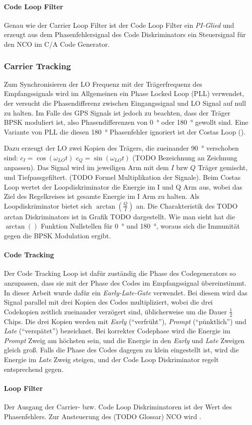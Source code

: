 \paragraph{Code Loop Filter} Genau wie der Carrier Loop Filter ist der Code Loop Filter ein \emph{PI-Glied} und erzeugt aus dem Phasenfehlersignal des Code Diskriminators ein Steuersignal für den NCO im C/A Code Generator.

\subsubsection{Carrier Tracking}
Zum Synchronisieren der LO Frequenz mit der Trägerfrequenz des Empfangssignals wird im Allgemeinen ein Phase Locked Loop (PLL) verwendet, der versucht die Phasendifferenz zwischen Eingangssignal und LO Signal auf null zu halten. Im Falle des GPS Signals ist jedoch zu beachten, dass der Träger BPSK moduliert ist, also Phasendifferenzen von \SI{0}{\degree} oder \SI{180}{\degree} gewollt sind. Eine Variante von PLL die diesen \SI{180}{\degree} Phasenfehler ignoriert ist der Costas Loop ().


Dazu erzeugt der LO zwei Kopien des Trägers, die zueinander \SI{90}{\degree} verschoben sind: $c_I=\cos(\omega_{LO} t)$ $c_Q=\sin(\omega_{LO} t)$ (TODO Bezeichnung an Zeichnung anpassen). Das Signal wird im jeweiligen Arm mit dem $I$ bzw $Q$ Träger gemischt, und Tiefpassgefiltert. (TODO Formel Multiplikation der Signale). Beim Costas Loop wertet der Loopdiskriminator die Energie im I und Q Arm aus, wobei das Ziel des Regelkreises ist gesamte Energie im I Arm zu halten. Als Loopdiskriminator bietet sich $\arctan\left(\frac{Q}{I}\right)$ an. Die Charakteristik des TODO arctan Diskriminators ist in Grafik TODO dargestellt. Wie man sieht hat die $\arctan()$ Funktion Nullstellen für \SI{0}{\degree} und \SI{180}{\degree}, woraus sich die Immunität gegen die BPSK Modulation ergibt.

\paragraph{Code Tracking}
Der Code Tracking Loop ist dafür zuständig die Phase des Codegenerators so anzupassen, dass sie mit der Phase des Codes im Empfangssignal übereinstimmt. In dieser Arbeit wurde dafür ein \emph{Early-Late-Gate} verwendet. Bei diesem wird das Signal parallel mit drei Kopien des Codes multipliziert, wobei die drei Codekopien zeitlich zueinander verzögert sind, üblicherweise um die Dauer $\frac{1}{2}$ Chips. Die drei Kopien werden mit \emph{Early} (\enquote{verfrüht}), \emph{Prompt} (\enquote{pünktlich}) und \emph{Late} (\enquote{verspätet}) bezeichnet. Bei korrekter Codephase wird die Energie im \emph{Prompt} Zweig am höchsten sein, und die Energie in den \emph{Early} und \emph{Late} Zweigen gleich groß. Falls die Phase des Codes dagegen zu klein eingestellt ist, wird die Energie im \emph{Late} Zweig steigen, und der Code Loop Diskriminator regelt entsprechend gegen.

\paragraph{Loop Filter}
Der Ausgang der Carrier- bzw. Code Loop Diskriminatoren ist der Wert des Phasenfehlers. Zur Ansteuerung des (TODO Glossar) NCO wird .